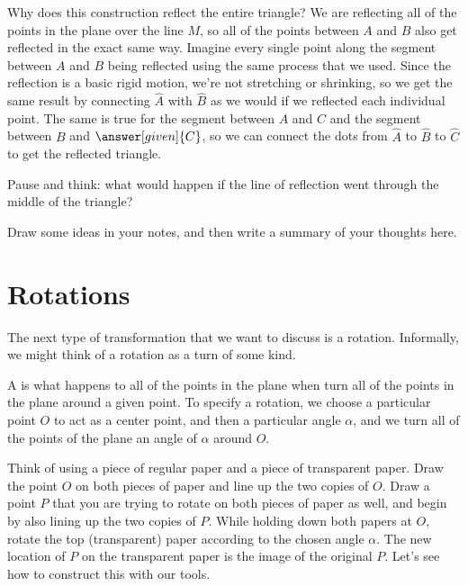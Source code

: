 \documentclass{ximera}
\begin{document}
\begin{example}
\begin{image}
\end{image}


Why does this construction reflect the entire triangle? We are reflecting all of the points in the plane over the line $M$, so all of the points between $A$ and $B$ also get reflected in the exact same way. Imagine every single point along the segment between $A$ and $B$ being reflected using the same process that we used. Since the reflection is a basic rigid motion, we're not stretching or shrinking, so we get the same result by connecting $\hat{A}$ with $\hat{B}$ as we would if we reflected each individual point. The same is true for the segment between $A$ and $C$ and the segment between $B$ and $\answer[given]{C}$, so we can connect the dots from $\hat{A}$ to $\hat{B}$ to $\hat{C}$ to get the reflected triangle.

\end{example}

\begin{question}
Pause and think: what would happen if the line of reflection went through the middle of the triangle?
\begin{freeResponse}
Draw some ideas in your notes, and then write a summary of your thoughts here.
\end{freeResponse}
\end{question}


\section{Rotations}
The next type of transformation that we want to discuss is a rotation. Informally, we might think of a rotation as a turn of some kind. 
\begin{definition}
A  is what happens to all of the points in the plane when turn all of the points in the plane around a given point. To specify a rotation, we choose a particular point $O$ to act as a center point, and then a particular angle $\alpha$, and we turn all of the points of the plane an angle of $\alpha$ around $O$. 
\end{definition}
Think of using a piece of regular paper and a piece of transparent paper. Draw the point $O$ on both pieces of paper and line up the two copies of $O$. Draw a point $P$ that you are trying to rotate on both pieces of paper as well, and begin by also lining up the two copies of $P$. While holding down both papers at $O$, rotate the top (transparent) paper according to the chosen angle $\alpha$. The new location of $P$ on the transparent paper is the image of the original $P$. Let's see how to construct this with our tools.
\end{document}

